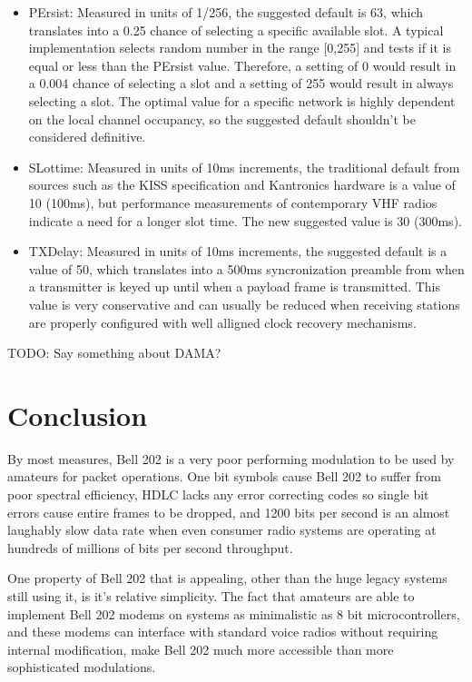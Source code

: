\documentclass[12pt,letterpaper]{article}
\begin{document}
\begin{itemize}
	\item PErsist: Measured in units of 1/256, the suggested default is
		63, which translates into a 0.25 chance of selecting a specific available
		slot. A typical implementation selects random number in the range
		[0,255] and tests if it is equal or less than the PErsist value.
		Therefore, a setting of 0 would result in a 0.004 chance of selecting 
		a slot and a setting of 255 would result in always selecting a slot.
		The optimal value for a specific network is highly dependent on the
		local channel occupancy, so the suggested default shouldn't
		be considered definitive.
	\item SLottime: Measured in units of 10ms increments, the traditional
		default from sources such as the KISS specification and 
		Kantronics hardware is a value of 10 (100ms), 
		but performance measurements of contemporary VHF radios 
		indicate a need for a longer slot time. 
		The new suggested value is 30 (300ms).
	\item TXDelay: Measured in units of 10ms increments, the suggested
		default is a value of 50, which translates into a 500ms syncronization
		preamble from when a transmitter is keyed up until when a payload
		frame is transmitted.
		This value is very conservative and can usually be reduced when
		receiving stations are properly configured with
		well alligned clock recovery mechanisms.
\end{itemize}

TODO: Say something about DAMA?

\section{Conclusion}


By most measures, Bell 202 is a very poor performing modulation to
be used by amateurs for packet operations. 
One bit symbols cause Bell 202 to suffer from poor spectral efficiency,
HDLC lacks any error correcting codes so single bit errors cause entire 
frames to be dropped, and 1200 bits per second is an almost laughably slow
data rate when even consumer radio systems are operating at hundreds of millions
of bits per second throughput.

One property of Bell 202 that is appealing, other than the 
huge legacy systems still using it, is it's relative simplicity.
The fact that amateurs are able to implement Bell 202 modems on
systems as minimalistic as 8 bit microcontrollers, and these modems can 
interface with standard voice radios without requiring internal modification, 
make Bell 202 much more accessible than more sophisticated modulations.
\end{document}
